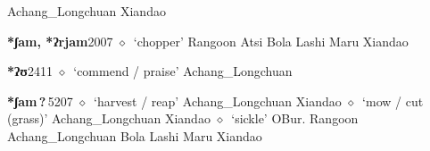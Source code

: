 \begin{list}{}{\leftmargin=1.5em \itemindent=-1.5em}
         Achang\_Longchuan 
\hspace{1ex}
         Xiandao 
  \item {\footnotesize \textbf{*ʃam, *ʔrjam}}{\tiny 2007}
\hspace{1ex}
         $\diamond$~`chopper'
         Rangoon 
\hspace{1ex}
         Atsi 
\hspace{1ex}
         Bola 
\hspace{1ex}
         Lashi 
\hspace{1ex}
         Maru 
\hspace{1ex}
         Xiandao 
  \item {\footnotesize \textbf{*ʔʊ}}{\tiny 2411}
\hspace{1ex}
         $\diamond$~`commend / praise'
         Achang\_Longchuan 
  \item {\footnotesize \textbf{*ʃam\,?\,}}{\tiny 5207}
\hspace{1ex}
         $\diamond$~`harvest / reap'
         Achang\_Longchuan 
\hspace{1ex}
         Xiandao 
\hspace{1ex}
         $\diamond$~`mow / cut (grass)'
         Achang\_Longchuan 
\hspace{1ex}
         Xiandao 
\hspace{1ex}
         $\diamond$~`sickle'
         OBur. 
\hspace{1ex}
         Rangoon 
\hspace{1ex}
         Achang\_Longchuan 
\hspace{1ex}
         Bola 
\hspace{1ex}
         Lashi 
\hspace{1ex}
         Maru 
\hspace{1ex}
         Xiandao 
  \end{list}
